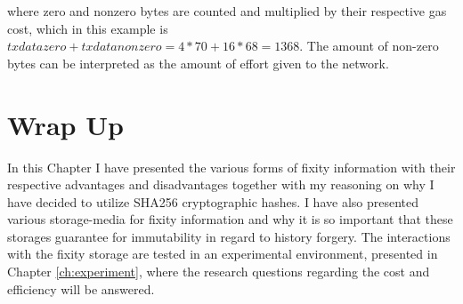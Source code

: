where zero and nonzero bytes are counted and multiplied by their respective gas cost, which in this example is $txdatazero+txdatanonzero = 4 * 70 + 16 * 68 = 1368 $. The amount of non-zero bytes can be interpreted as the amount of effort given to the network.

\section{Wrap Up}
In this Chapter I have presented the various forms of fixity information with their respective advantages and disadvantages together with my reasoning on why I have decided to utilize SHA256 cryptographic hashes. I have also presented various storage-media for fixity information and why it is so important that these storages guarantee for immutability in regard to history forgery. The interactions with the fixity storage are tested in an experimental environment, presented in Chapter \ref{ch:experiment}, where the research questions regarding the cost and efficiency will be answered.